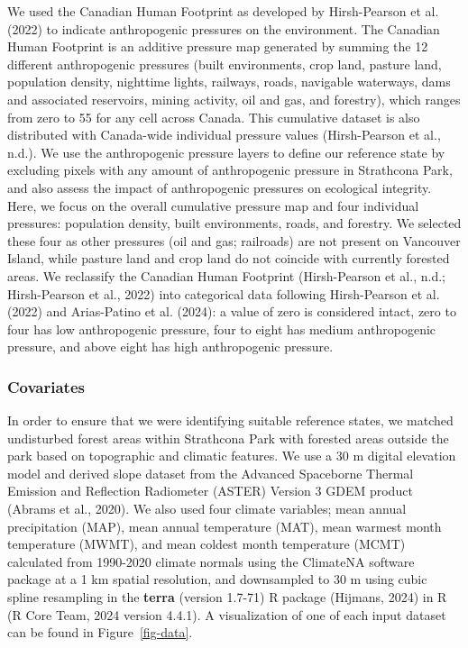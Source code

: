 \documentclass[
]{agujournal2019}
\begin{document}
We used the Canadian Human Footprint as developed by Hirsh-Pearson et
al. (2022) to indicate anthropogenic pressures on the environment. The
Canadian Human Footprint is an additive pressure map generated by
summing the 12 different anthropogenic pressures (built environments,
crop land, pasture land, population density, nighttime lights, railways,
roads, navigable waterways, dams and associated reservoirs, mining
activity, oil and gas, and forestry), which ranges from zero to 55 for
any cell across Canada. This cumulative dataset is also distributed with
Canada-wide individual pressure values (Hirsh-Pearson et al., n.d.). We
use the anthropogenic pressure layers to define our reference state by
excluding pixels with any amount of anthropogenic pressure in Strathcona
Park, and also assess the impact of anthropogenic pressures on
ecological integrity. Here, we focus on the overall cumulative pressure
map and four individual pressures: population density, built
environments, roads, and forestry. We selected these four as other
pressures (oil and gas; railroads) are not present on Vancouver Island,
while pasture land and crop land do not coincide with currently forested
areas. We reclassify the Canadian Human Footprint (Hirsh-Pearson et al.,
n.d.; Hirsh-Pearson et al., 2022) into categorical data following
Hirsh-Pearson et al. (2022) and Arias-Patino et al. (2024): a value of
zero is considered intact, zero to four has low anthropogenic pressure,
four to eight has medium anthropogenic pressure, and above eight has
high anthropogenic pressure.

\subsubsection{Covariates}\label{covariates}

In order to ensure that we were identifying suitable reference states,
we matched undisturbed forest areas within Strathcona Park with forested
areas outside the park based on topographic and climatic features. We
use a 30 m digital elevation model and derived slope dataset from the
Advanced Spaceborne Thermal Emission and Reflection Radiometer (ASTER)
Version 3 GDEM product (Abrams et al., 2020). We also used four climate
variables; mean annual precipitation (MAP), mean annual temperature
(MAT), mean warmest month temperature (MWMT), and mean coldest month
temperature (MCMT) calculated from 1990-2020 climate normals using the
ClimateNA software package at a 1 km spatial resolution, and downsampled
to 30 m using cubic spline resampling in the \textbf{terra} (version
1.7-71) R package (Hijmans, 2024) in R (R Core Team, 2024 version
4.4.1). A visualization of one of each input dataset can be found in
Figure~\ref{fig-data}.
\end{document}

